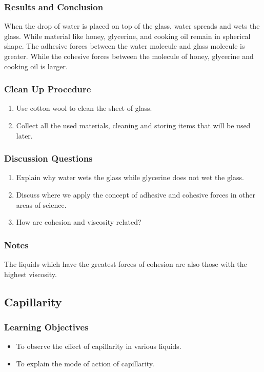 \subsubsection*{Results and Conclusion}
When the drop of water is placed on top of the glass, water spreads and wets the glass. While material like honey, glycerine, and cooking oil remain in spherical shape. The adhesive forces between the water molecule and glass molecule is greater. While the cohesive forces between the molecule of honey, glycerine and cooking oil is larger.

\subsubsection*{Clean Up Procedure}
\begin{enumerate}
\item{Use cotton wool to clean the sheet of glass.}
\item{Collect all the used materials, cleaning and storing items that will be used later.}
\end{enumerate}

\subsubsection*{Discussion Questions}
\begin{enumerate}
\item{Explain why water wets the glass while glycerine does not wet the glass.}
\item{Discuss where we apply the concept of adhesive and cohesive forces in other areas of science.}
\item{How are cohesion and viscosity related?}
\end{enumerate}

\subsubsection*{Notes}
The liquids which have the greatest forces of cohesion are also those with the highest viscosity.

\subsection{Capillarity}

\subsubsection*{Learning Objectives}
\begin{itemize}
\item{To observe the effect of capillarity in various liquids.} 
\item{To explain the mode of action of capillarity.} 
\end{itemize}

